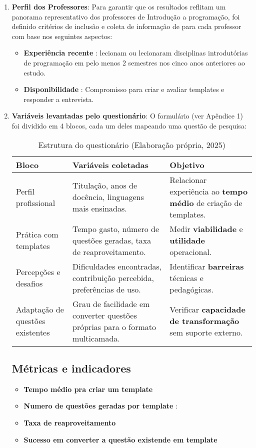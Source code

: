 \begin{enumerate}
    \item \textbf{Perfil dos Professores}:  Para garantir que os resultados reflitam um panorama representativo dos professores de Introdução a programação, foi definido critérios de inclusão e coleta de informação de para cada professor com base nos seguintes aspectos: 
    \begin{itemize}
        \item \textbf{Experiência recente} : lecionam ou lecionaram disciplinas introdutórias de programação em pelo menos 2 semestres nos cinco anos anteriores ao estudo. 
        \item \textbf{Disponibilidade} : Compromisso para criar e avaliar templates e responder a entrevista.
    \end{itemize}

    \item \textbf{Variáveis levantadas pelo questionário}:  O formulário (ver Apêndice 1) foi dividido em 4 blocos, cada um deles mapeando uma questão de pesquisa: 

\begin{table}[htbp]
    \centering
    
    \begin{tabular}{|p{4cm}|p{5.4cm}|p{6cm}|}
        \hline
        \textbf{Bloco} & \textbf{Variáveis coletadas} & \textbf{Objetivo} \\ \hline
        Perfil profissional & Titulação, anos de docência, linguagens mais ensinadas. & Relacionar experiência ao \textbf{tempo médio} de criação de templates. \\ \hline
        Prática com templates & Tempo gasto, número de questões geradas, taxa de reaproveitamento. & Medir \textbf{viabilidade} e \textbf{utilidade} operacional. \\ \hline
        Percepções e desafios & Dificuldades encontradas, contribuição percebida, preferências de uso. & Identificar \textbf{barreiras} técnicas e pedagógicas. \\ \hline
        Adaptação de questões existentes & Grau de facilidade em converter questões próprias para o formato multicamada. & Verificar \textbf{capacidade de transformação} sem suporte externo. \\ \hline
    \end{tabular}
    \caption{Estrutura do questionário (Elaboração própria, 2025)}
    \label{tab:questionario-objetivos}
\end{table}




\subsection{Métricas e indicadores}
    \begin{itemize}
        \item \textbf{Tempo médio pra criar um template} 
        \item \textbf{Numero de questões geradas por template} :
        \item \textbf{Taxa de reaproveitamento} 
        \item  \textbf{Sucesso em converter a questão existende em template} 
    \end{itemize}


\end{enumerate}
